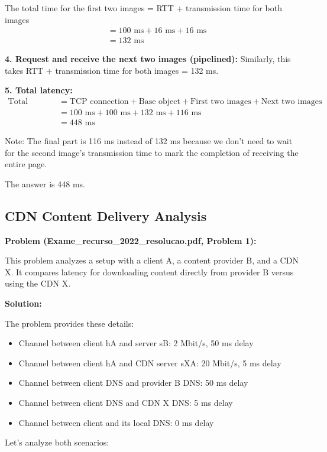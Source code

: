 \documentclass[11pt,a4paper]{article}
\begin{document}
The total time for the first two images = RTT + transmission time for both images
\begin{align}
    &= 100 \text{ ms} + 16 \text{ ms} + 16 \text{ ms}\\
    &= 132 \text{ ms}
\end{align}

\textbf{4. Request and receive the next two images (pipelined):}
Similarly, this takes RTT + transmission time for both images = 132 ms.

\textbf{5. Total latency:}
\begin{align}
    \text{Total latency} &= \text{TCP connection} + \text{Base object} + \text{First two images} + \text{Next two images}\\
    &= 100 \text{ ms} + 100 \text{ ms} + 132 \text{ ms} + 116 \text{ ms}\\
    &= 448 \text{ ms}
\end{align}

Note: The final part is 116 ms instead of 132 ms because we don't need to wait for the second image's transmission time to mark the completion of receiving the entire page.

The answer is 448 ms.

\subsection{CDN Content Delivery Analysis}
\textbf{Problem (Exame\_recurso\_2022\_resolucao.pdf, Problem 1):}

This problem analyzes a setup with a client A, a content provider B, and a CDN X. It compares latency for downloading content directly from provider B versus using the CDN X.

\textbf{Solution:}

The problem provides these details:
\begin{itemize}
    \item Channel between client hA and server sB: 2 Mbit/s, 50 ms delay
    \item Channel between client hA and CDN server sXA: 20 Mbit/s, 5 ms delay
    \item Channel between client DNS and provider B DNS: 50 ms delay
    \item Channel between client DNS and CDN X DNS: 5 ms delay
    \item Channel between client and its local DNS: 0 ms delay
\end{itemize}

Let's analyze both scenarios:
\end{document}

